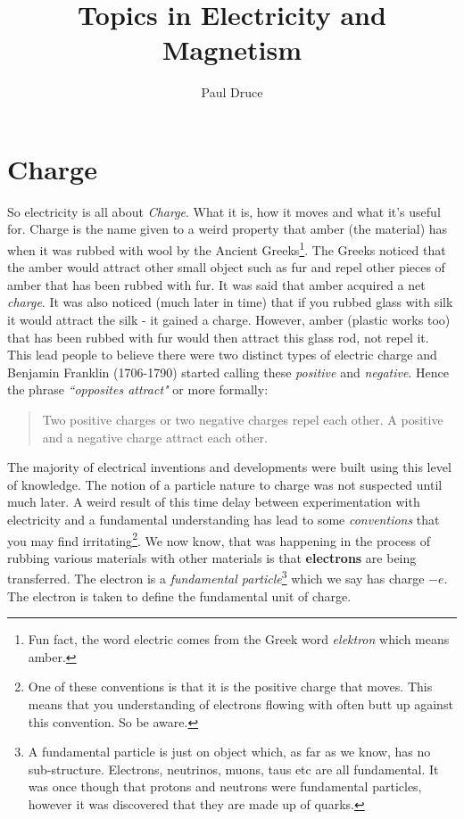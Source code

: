 \documentclass[12pt]{article}
\title{Topics in Electricity and Magnetism}
\author{Paul Druce}
\date{}
\begin{document}
\maketitle

\section{Charge}\label{the-basics}

So electricity is all about \emph{Charge}. What it is, how it moves and what it's useful for. 
Charge is the name given to a weird property that amber (the material) has when it was rubbed with wool by the Ancient Greeks\footnote{Fun fact, the word electric comes from the Greek word \emph{elektron} which means amber.}. 
The Greeks noticed that the amber would attract other small object such as fur and repel other pieces of amber that has been rubbed with fur. It was said that amber acquired a net \emph{charge}. 
It was also noticed (much later in time) that if you rubbed glass with silk it would attract the silk - it gained a charge. However, amber (plastic works too) that has been rubbed with fur would then attract this glass rod, not repel it. 
This lead people to believe there were two distinct types of electric charge and Benjamin Franklin (1706-1790) started calling these \emph{positive} and \emph{negative}. 
Hence the phrase \emph{``opposites attract"} or more formally:
\begin{quote}
Two positive charges or two negative charges repel each other. A
positive and a negative charge attract each other.
\end{quote}


The majority of electrical inventions and developments were built using this level of knowledge. The notion of a particle nature to charge was not suspected until much later. A weird result of this time delay between experimentation with electricity and a fundamental understanding has lead to some \emph{conventions} that you may find irritating\footnote{One of these conventions is that it is the positive charge that moves. This means that you understanding of electrons flowing with often butt up against this convention. So be aware.}. We now know, that was happening in the process of rubbing various
materials with other materials is that \textbf{electrons} are being
transferred. 
The electron is a \emph{fundamental particle}\footnote{A fundamental particle is just on object which, as far as we know, has no sub-structure. Electrons, neutrinos, muons, taus etc are all fundamental. It was once though that protons and neutrons were fundamental particles, however it was discovered that they are made up of quarks.} which we say has charge \(-e\). 
The electron is taken to define the fundamental
unit of charge. 
\end{document}
